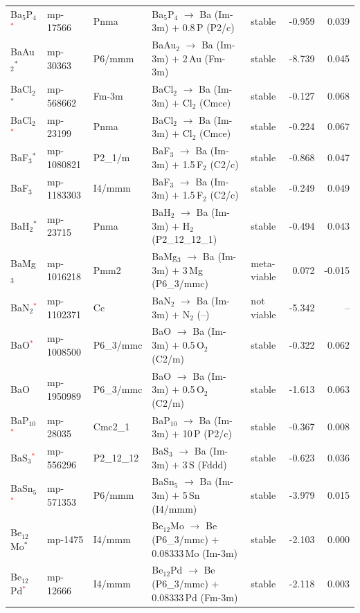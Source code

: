 \begin{longtable}{@{}ll l@{\hspace{4pt}} p{4.6cm} l@{\hspace{4pt}} rr@{}}
Ba$_{5}$P$_{4}$\textcolor{red}{$^*$} & mp-17566 & Pnma & Ba$_{5}$P$_{4}$ $\to$ Ba (Im-3m) $+$ 0.8\,P (P2/c) & stable & -0.959 & 0.039 \\
BaAu$_{2}$$^*$ & mp-30363 & P6/mmm & BaAu$_{2}$ $\to$ Ba (Im-3m) $+$ 2\,Au (Fm-3m) & stable & -8.739 & 0.045 \\
BaCl$_{2}$$^*$ & mp-568662 & Fm-3m & BaCl$_{2}$ $\to$ Ba (Im-3m) $+$ Cl$_{2}$ (Cmce) & stable & -0.127 & 0.068 \\
BaCl$_{2}$\textcolor{red}{$^*$} & mp-23199 & Pnma & BaCl$_{2}$ $\to$ Ba (Im-3m) $+$ Cl$_{2}$ (Cmce) & stable & -0.224 & 0.067 \\
BaF$_{3}$$^*$ & mp-1080821 & P2\_1/m & BaF$_{3}$ $\to$ Ba (Im-3m) $+$ 1.5\,F$_{2}$ (C2/c) & stable & -0.868 & 0.047 \\
BaF$_{3}$ & mp-1183303 & I4/mmm & BaF$_{3}$ $\to$ Ba (Im-3m) $+$ 1.5\,F$_{2}$ (C2/c) & stable & -0.249 & 0.049 \\
BaH$_{2}$$^*$ & mp-23715 & Pnma & BaH$_{2}$ $\to$ Ba (Im-3m) $+$ H$_{2}$ (P2\_12\_12\_1) & stable & -0.494 & 0.043 \\
BaMg$_{3}$ & mp-1016218 & Pmm2 & BaMg$_{3}$ $\to$ Ba (Im-3m) $+$ 3\,Mg (P6\_3/mmc) & meta-viable & 0.072 & -0.015 \\
BaN$_{2}$\textcolor{red}{$^*$} & mp-1102371 & Cc & BaN$_{2}$ $\to$ Ba (Im-3m) $+$ N$_{2}$ (--) & not viable & -5.342 & -- \\
BaO\textcolor{red}{$^*$} & mp-1008500 & P6\_3/mmc & BaO $\to$ Ba (Im-3m) $+$ 0.5\,O$_{2}$ (C2/m) & stable & -0.322 & 0.062 \\
BaO & mp-1950989 & P6\_3/mmc & BaO $\to$ Ba (Im-3m) $+$ 0.5\,O$_{2}$ (C2/m) & stable & -1.613 & 0.063 \\
BaP$_{10}$\textcolor{red}{$^*$} & mp-28035 & Cmc2\_1 & BaP$_{10}$ $\to$ Ba (Im-3m) $+$ 10\,P (P2/c) & stable & -0.367 & 0.008 \\
BaS$_{3}$\textcolor{red}{$^*$} & mp-556296 & P2\_12\_12 & BaS$_{3}$ $\to$ Ba (Im-3m) $+$ 3\,S (Fddd) & stable & -0.623 & 0.036 \\
BaSn$_{5}$\textcolor{red}{$^*$} & mp-571353 & P6/mmm & BaSn$_{5}$ $\to$ Ba (Im-3m) $+$ 5\,Sn (I4/mmm) & stable & -3.979 & 0.015 \\
Be$_{12}$Mo$^*$ & mp-1475 & I4/mmm & Be$_{12}$Mo $\to$ Be (P6\_3/mmc) $+$ 0.08333\,Mo (Im-3m) & stable & -2.103 & 0.000 \\
Be$_{12}$Pd\textcolor{red}{$^*$} & mp-12666 & I4/mmm & Be$_{12}$Pd $\to$ Be (P6\_3/mmc) $+$ 0.08333\,Pd (Fm-3m) & stable & -2.118 & 0.003 \\

\end{longtable}

